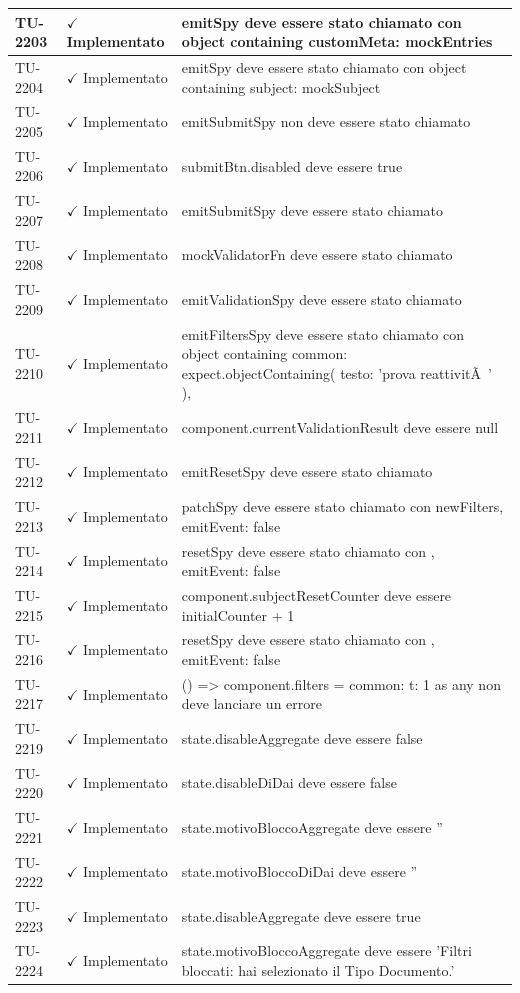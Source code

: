 ﻿\documentclass[a4paper,12pt]{article}
\newcommand{\ok}{\textcolor{green!60!black}{$\checkmark$ Implementato}}
\begin{document}
\begin{longtable}{|p{2cm}|p{3.5cm}|p{9.5cm}|}
\hline
TU-2203 & \ok & emitSpy deve essere stato chiamato con object containing { customMeta: mockEntries } \\
\hline
TU-2204 & \ok & emitSpy deve essere stato chiamato con object containing { subject: mockSubject } \\
\hline
TU-2205 & \ok & emitSubmitSpy non deve essere stato chiamato \\
\hline
TU-2206 & \ok & submitBtn.disabled deve essere true \\
\hline
TU-2207 & \ok & emitSubmitSpy deve essere stato chiamato \\
\hline
TU-2208 & \ok & mockValidatorFn deve essere stato chiamato \\
\hline
TU-2209 & \ok & emitValidationSpy deve essere stato chiamato \\
\hline
TU-2210 & \ok & emitFiltersSpy deve essere stato chiamato con object containing { common: expect.objectContaining({ testo: 'prova reattivitÃ ' }), } \\
\hline
TU-2211 & \ok & component.currentValidationResult deve essere null \\
\hline
TU-2212 & \ok & emitResetSpy deve essere stato chiamato \\
\hline
TU-2213 & \ok & patchSpy deve essere stato chiamato con newFilters, { emitEvent: false } \\
\hline
TU-2214 & \ok & resetSpy deve essere stato chiamato con {}, { emitEvent: false } \\
\hline
TU-2215 & \ok & component.subjectResetCounter deve essere initialCounter + 1 \\
\hline
TU-2216 & \ok & resetSpy deve essere stato chiamato con {}, { emitEvent: false } \\
\hline
TU-2217 & \ok & () => { component.filters = { common: { t: 1 } } as any } non deve lanciare un errore \\
\hline
TU-2219 & \ok & state.disableAggregate deve essere false \\
\hline
TU-2220 & \ok & state.disableDiDai deve essere false \\
\hline
TU-2221 & \ok & state.motivoBloccoAggregate deve essere '' \\
\hline
TU-2222 & \ok & state.motivoBloccoDiDai deve essere '' \\
\hline
TU-2223 & \ok & state.disableAggregate deve essere true \\
\hline
TU-2224 & \ok & state.motivoBloccoAggregate deve essere 'Filtri bloccati: hai selezionato il Tipo Documento.' \\

\end{longtable}
\end{document}
